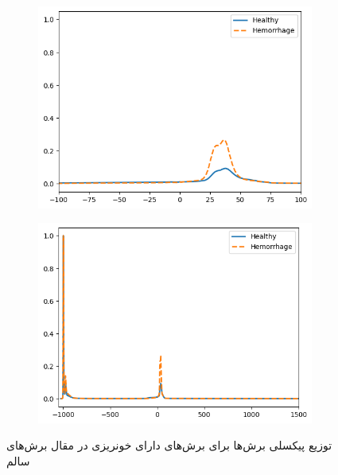  \begin{figure}[ht]
		\centering %
		\begin{subfigure}{0.45\textwidth}
			\includegraphics[width=\linewidth]{Images/Chapter2/Pixel histogram.png}
			\caption{}
			\label{fig: ch2-slice hist whole}
		\end{subfigure}\hfil %
		\begin{subfigure}{0.45\textwidth}
			\includegraphics[width=\linewidth,]{Images/Chapter2/Pixel histogram lim.png}
			\caption{}
			\label{fig: ch2-slice hist lim}
		\end{subfigure}
		\caption{توزیع پیکسلی برش‌ها برای برش‌های دارای خونریزی در مقال برش‌های سالم}
		\label{fig: ch2-slice hist}
\end{figure} 

